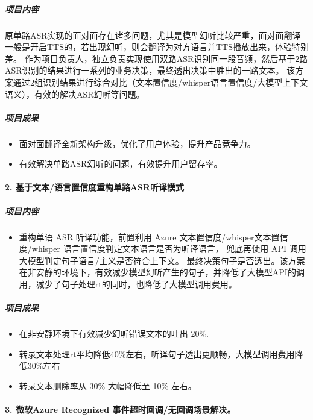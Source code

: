 \subparagraph{项目内容}\label{ux9879ux76eeux5185ux5bb9}

原单路ASR实现的面对面存在诸多问题，尤其是模型幻听比较严重，面对面翻译一般是开启TTS的，若出现幻听，则会翻译为对方语言并TTS播放出来，体验特别差。
作为项目负责人，独立负责实现使用双路ASR识别同一段音频，然后基于2路ASR识别的结果进行一系列的业务决策，最终透出决策中胜出的一路文本。
该方案通过2组识别结果进行综合对比（文本置信度/whisper语言置信度/大模型上下文语义），有效的解决ASR幻听等问题。

\subparagraph{项目成果}\label{ux9879ux76eeux6210ux679c}

\begin{itemize}
\tightlist
\item
  面对面翻译全新架构升级，优化了用户体验，提升产品竞争力。
\item
  有效解决单路ASR幻听的问题，有效提升用户留存率。
\end{itemize}

\paragraph{2.
基于文本/语言置信度重构单路ASR听译模式}\label{ux57faux4e8eux6587ux672cux8bedux8a00ux7f6eux4fe1ux5ea6ux91cdux6784ux5355ux8defasrux542cux8bd1ux6a21ux5f0f}

\subparagraph{项目内容}\label{ux9879ux76eeux5185ux5bb9-1}

\begin{itemize}
\tightlist
\item
  重构单语 ASR 听译功能，前置利用 Azure
  文本置信度/whisper文本置信度/whisper
  语言置信度判定文本语言是否为听译语言， 兜底再使用 API
  调用大模型判定句子语言/主义是否符合上下文。
  最终决策句子是否透出。该方案在非安静的环境下，有效减少模型幻听产生的句子，并降低了大模型API的调用，减少了句子处理rt的同时，也降低了大模型调用费用。
\end{itemize}

\subparagraph{项目成果}\label{ux9879ux76eeux6210ux679c-1}

\begin{itemize}
\tightlist
\item
  在非安静环境下有效减少幻听错误文本的吐出 20\%.
\item
  转录文本处理rt平均降低40\%左右，听译句子透出更顺畅，大模型调用费用降低30\%左右
\item
  转录文本删除率从 30\% 大幅降低至 10\% 左右。
\end{itemize}

\paragraph{3. 微软Azure Recognized
事件超时回调/无回调场景解决。}\label{ux5faeux8f6fazure-recognized-ux4e8bux4ef6ux8d85ux65f6ux56deux8c03ux65e0ux56deux8c03ux573aux666fux89e3ux51b3}

